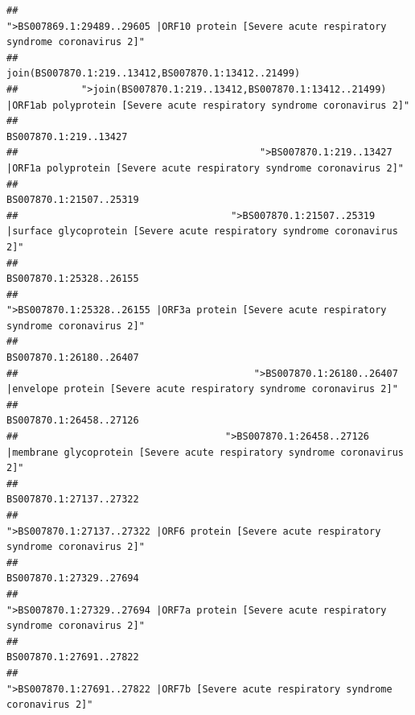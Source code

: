 \documentclass[
]{article}
\begin{document}
\begin{verbatim}
##                                            ">BS007869.1:29489..29605 |ORF10 protein [Severe acute respiratory syndrome coronavirus 2]" 
##                                                                                    join(BS007870.1:219..13412,BS007870.1:13412..21499) 
##           ">join(BS007870.1:219..13412,BS007870.1:13412..21499) |ORF1ab polyprotein [Severe acute respiratory syndrome coronavirus 2]" 
##                                                                                                                  BS007870.1:219..13427 
##                                          ">BS007870.1:219..13427 |ORF1a polyprotein [Severe acute respiratory syndrome coronavirus 2]" 
##                                                                                                                BS007870.1:21507..25319 
##                                     ">BS007870.1:21507..25319 |surface glycoprotein [Severe acute respiratory syndrome coronavirus 2]" 
##                                                                                                                BS007870.1:25328..26155 
##                                            ">BS007870.1:25328..26155 |ORF3a protein [Severe acute respiratory syndrome coronavirus 2]" 
##                                                                                                                BS007870.1:26180..26407 
##                                         ">BS007870.1:26180..26407 |envelope protein [Severe acute respiratory syndrome coronavirus 2]" 
##                                                                                                                BS007870.1:26458..27126 
##                                    ">BS007870.1:26458..27126 |membrane glycoprotein [Severe acute respiratory syndrome coronavirus 2]" 
##                                                                                                                BS007870.1:27137..27322 
##                                             ">BS007870.1:27137..27322 |ORF6 protein [Severe acute respiratory syndrome coronavirus 2]" 
##                                                                                                                BS007870.1:27329..27694 
##                                            ">BS007870.1:27329..27694 |ORF7a protein [Severe acute respiratory syndrome coronavirus 2]" 
##                                                                                                                BS007870.1:27691..27822 
##                                                    ">BS007870.1:27691..27822 |ORF7b [Severe acute respiratory syndrome coronavirus 2]" 

\end{verbatim}
\end{document}
